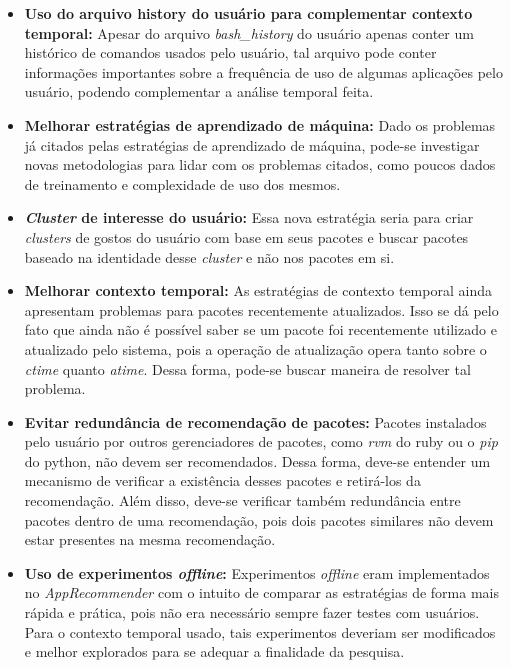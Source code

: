 \begin{itemize}
  \item \textbf{Uso do arquivo history do usuário para complementar contexto
  temporal:} Apesar do arquivo \textit{bash\_history} do usuário apenas conter um
  histórico de comandos usados pelo usuário, tal arquivo pode conter informações
  importantes sobre a frequência de uso de algumas aplicações pelo usuário,
  podendo complementar a análise temporal feita.
  \item \textbf{Melhorar estratégias de aprendizado de máquina:} Dado os
  problemas já citados pelas estratégias de aprendizado de máquina, pode-se
  investigar novas metodologias para lidar com os problemas citados, como poucos
  dados de treinamento e complexidade de uso dos mesmos.
  \item \textbf{\textit{Cluster} de interesse do usuário:} Essa nova estratégia seria
  para criar \textit{clusters} de gostos do usuário com base em seus pacotes e
  buscar pacotes baseado na identidade desse \textit{cluster} e não nos pacotes
  em si.
  \item \textbf{Melhorar contexto temporal:} As estratégias de contexto
  temporal ainda apresentam problemas para pacotes recentemente atualizados.
  Isso se dá pelo fato que ainda não é possível saber se um pacote foi
  recentemente utilizado e atualizado pelo sistema, pois a operação de
  atualização opera tanto sobre o \textit{ctime} quanto \textit{atime}. Dessa
  forma, pode-se buscar maneira de resolver tal problema.
  \item \textbf{Evitar redundância de recomendação de pacotes:} Pacotes
  instalados pelo usuário por outros gerenciadores de pacotes, como
  \textit{rvm} do ruby ou o \textit{pip} do python, não devem ser
  recomendados. Dessa forma, deve-se entender um mecanismo de verificar a
  existência desses pacotes e retirá-los da recomendação. Além disso, deve-se
  verificar também redundância entre pacotes dentro de uma recomendação,
  pois dois pacotes similares não devem estar presentes na mesma
  recomendação.
  \item \textbf{Uso de experimentos \textit{offline}:} Experimentos \textit{offline} eram
  implementados no \textit{AppRecommender} com o intuito de comparar as
  estratégias de forma mais rápida e prática, pois não era necessário
  sempre fazer testes com usuários. Para o contexto temporal usado, tais
  experimentos deveriam ser modificados e melhor explorados para se
  adequar a finalidade da pesquisa.
\end{itemize}
